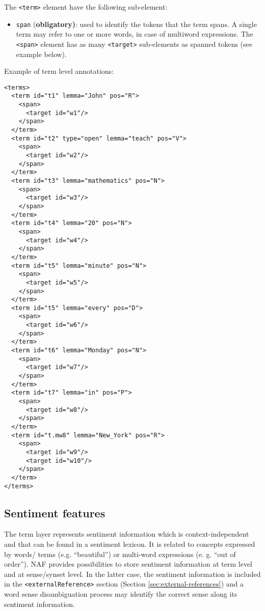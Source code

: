 The \texttt{<term>} element have the following sub-element:
\begin{itemize}
\item \texttt{span} (\textbf{obligatory)}: used to identify the tokens that
  the term spans. A single term may refer to one or more words, in case of
  multiword expressions. The \texttt{<span>} element has as many
  \texttt{<target>} sub-elements as spanned tokens (see example below).
\end{itemize}

Example of term level annotations:
\begin{Verbatim}[fontsize=\small]
<terms>
  <term id="t1" lemma="John" pos="R">
    <span>
      <target id="w1"/>
    </span>
  </term>
  <term id="t2" type="open" lemma="teach" pos="V">
    <span>
      <target id="w2"/>
    </span>
  </term>
  <term id="t3" lemma="mathematics" pos="N">
    <span>
      <target id="w3"/>
    </span>
  </term>
  <term id="t4" lemma="20" pos="N">
    <span>
      <target id="w4"/>
    </span>
  </term>
  <term id="t5" lemma="minute" pos="N">
    <span>
      <target id="w5"/>
    </span>
  </term>
  <term id="t5" lemma="every" pos="D">
    <span>
      <target id="w6"/>
    </span>
  </term>
  <term id="t6" lemma="Monday" pos="N">
    <span>
      <target id="w7"/>
    </span>
  </term>
  <term id="t7" lemma="in" pos="P">
    <span>
      <target id="w8"/>
    </span>
  </term>
  <term id="t.mw8" lemma="New_York" pos="R">
    <span>
      <target id="w9"/>
      <target id="w10"/>
    </span>
  </term>
</terms>
\end{Verbatim}


\subsection{Sentiment features}
\label{sec:sentiment-features}

The term layer represents sentiment information which is context-independent
and that can be found in a sentiment lexicon. It is related to concepts
expressed by words/ terms (e.g. ``beautiful'') or multi-word expressions
(e. g. ``out of order''). NAF provides possibilities to store sentiment
information at term level and at sense/synset level. In the latter case, the
sentiment information is included in the \texttt{<externalReference>}
section (Section \ref{sec:external-references}) and a word sense
disambiguation process may identify the correct sense along its sentiment
information. \\

